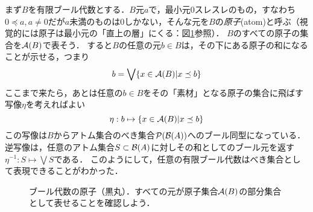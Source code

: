 \documentclass[11pt,a4paper, dvipdfmx]{jsarticle}
\begin{document}
まず$B$を有限ブール代数とする．$B$元$a$で，最小元$0$スレスレのもの，すなわち$0 \preceq a, a \neq 0$だが$a$未満のものは$0$しかない，そんな元を$B$の\emph{原子}(atom)と呼ぶ（視覚的には原子は最小元の「直上の層」にくる：図\ref{fig:atoms}参照）．
$B$のすべての原子の集合を$\mathcal{A}(B)$で表そう．
すると$B$の任意の元$b \in B$は，その下にある原子の和になることが示せる，つまり
\[ b = \bigvee \{ x \in \mathcal{A}(B) | x \preceq b \} \]
ここまで来たら，あとは任意の$b \in B$をその「素材」となる原子の集合に飛ばす写像$\eta$を考えればよい
\[ \eta: b \mapsto \{ x \in \mathcal{A}(B) | x \preceq b \} \]
この写像は$B$からアトム集合のべき集合$\mathcal{P}(\mathcal{B}(A))$へのブール同型になっている．
逆写像は，任意のアトム集合$S \subset \mathcal{B}(A)$に対しその和としてのブール元を返す$\eta^{-1}: S \mapsto \bigvee S$である．
このようにして，任意の有限ブール代数はべき集合として表現できることがわかった．

\begin{figure}[h]
    \centering
    \caption{ブール代数の原子（黒丸）．すべての元が原子集合$\mathcal{A}(B)$の部分集合として表せることを確認しよう．}
    \label{fig:atoms} 
\end{figure}
    
\end{document}
